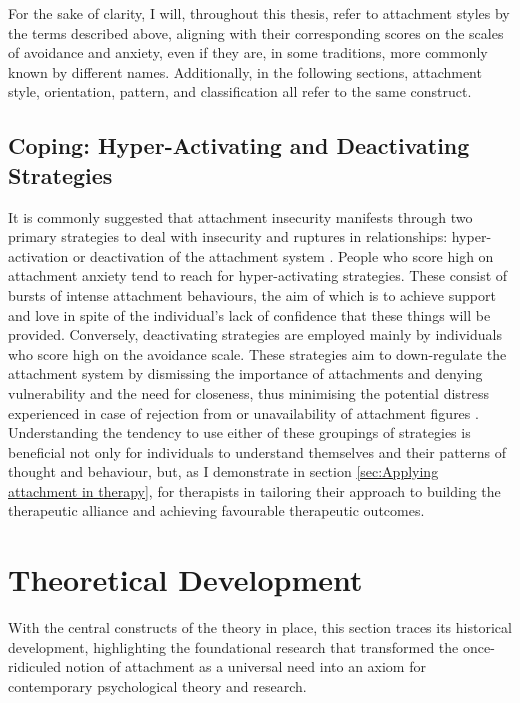 \documentclass[12pt]{report}
\begin{document}
For the sake of clarity, I will, throughout this thesis, refer to attachment styles by the terms described above, aligning with their corresponding scores on the scales of avoidance and anxiety, even if they are, in some traditions, more commonly known by different names.
Additionally, in the following sections, attachment style, orientation, pattern, and classification all refer to the same construct.

\subsection*{Coping: Hyper-Activating and Deactivating Strategies}
It is commonly suggested that attachment insecurity manifests through two primary strategies to deal with insecurity and ruptures in relationships: hyper-activation or deactivation of the attachment system .
People who score high on attachment anxiety tend to reach for hyper-activating strategies.
These consist of bursts of intense attachment behaviours, the aim of which is to achieve support and love in spite of the individual's lack of confidence that these things will be provided.
Conversely, deactivating strategies are employed mainly by individuals who score high on the avoidance scale.
These strategies aim to down-regulate the attachment system by dismissing the importance of attachments and denying vulnerability and the need for closeness, thus minimising the potential distress experienced in case of rejection from or unavailability of attachment figures \cite{Mikulincer2003}.
Understanding the tendency to use either of these groupings of strategies is beneficial not only for individuals to understand themselves and their patterns of thought and behaviour, but, as I demonstrate in section \ref{sec:Applying attachment in therapy}, for therapists in tailoring their approach to building the therapeutic alliance and achieving favourable therapeutic outcomes.

\section{Theoretical Development}
With the central constructs of the theory in place, this section traces its historical development, highlighting the foundational research that transformed the once-ridiculed notion of attachment as a universal need into an axiom for contemporary psychological theory and research.
\end{document}
